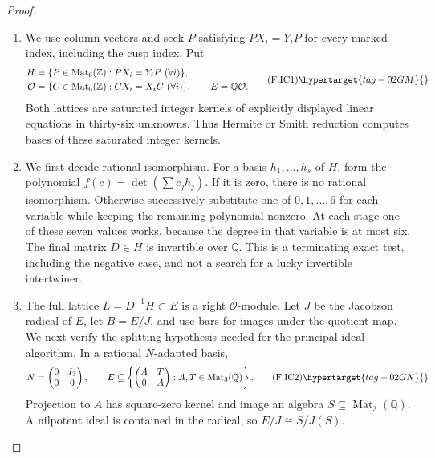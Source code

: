 \begin{proof}
\begin{enumerate}[label={$\langle1\rangle$\arabic*.}]
\item We use column vectors and seek $P$ satisfying $PX_i=Y_iP$ for every
marked index, including the cusp index. Put
\[
\begin{aligned}
 H&=\{P\in\operatorname{Mat}_6(\mathbb Z):PX_i=Y_iP\ (\forall i)\},\\
 \mathcal O&=\{C\in\operatorname{Mat}_6(\mathbb Z):CX_i=X_iC\ (\forall i)\},
 \qquad E=\mathbb Q\mathcal O.
\end{aligned}                                                    \tag{F.IC1}\hypertarget{tag-02GM}{}\label{maps:eq:F.IC1}
\]
Both lattices are saturated integer kernels of explicitly displayed
linear equations in thirty-six unknowns. Thus Hermite or Smith reduction computes bases of these saturated
integer kernels.

\item We first decide rational isomorphism. For a basis $h_1,\ldots,h_s$ of
$H$, form the polynomial $f(c)=\det(\sum c_jh_j)$. If it is zero,
there is no rational isomorphism. Otherwise successively substitute
one of $0,1,\ldots,6$ for each variable while keeping the remaining
polynomial nonzero. At each stage one of these seven values works,
because the degree in that variable is at most six. The final matrix
$D\in H$ is invertible over $\mathbb Q$. This is a terminating exact
test, including the negative case, and not a search for a lucky
invertible intertwiner.

\item The full lattice $L=D^{-1}H\subset E$ is a right $\mathcal O$-module.
Let $J$ be the Jacobson radical of $E$, let $B=E/J$, and use bars
for images under the quotient map. We next verify the splitting
hypothesis needed for the principal-ideal algorithm. In a rational
$N$-adapted basis,
\[
 N=\begin{pmatrix}0&I_3\\0&0\end{pmatrix},\qquad
 E\subseteq
 \left\{\begin{pmatrix}A&T\\0&A\end{pmatrix}:A,T\in
                                      \operatorname{Mat}_3(\mathbb Q)\right\}.
                                                               \tag{F.IC2}\hypertarget{tag-02GN}{}\label{maps:eq:F.IC2}
\]
Projection to $A$ has square-zero kernel and image an algebra
$S\subseteq\operatorname{Mat}_3(\mathbb Q)$. A nilpotent ideal is
contained in the radical, so $E/J\cong S/J(S)$.


\end{enumerate}
\end{proof}
